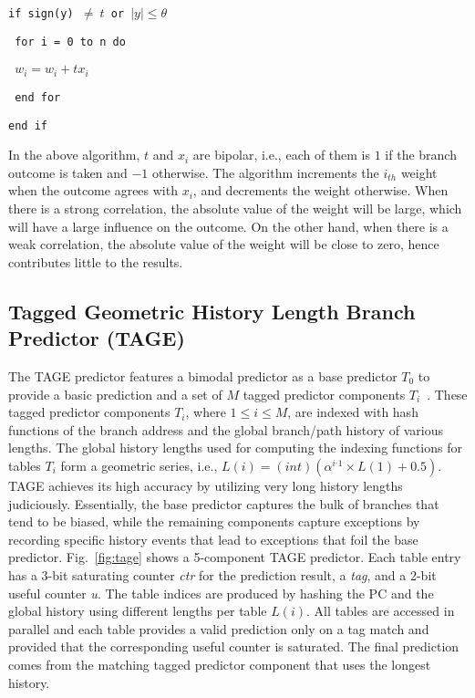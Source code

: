 \begin{spacing}{1} 
\texttt{if sign(y) $\neq\ t$ or $\left| y \right| \leq \theta$}

\texttt{\hspace{8mm} for i = 0 to n do}

\texttt{\hspace{16mm} $w_i = w_i + tx_i$}

\texttt{\hspace{8mm} end for}

\texttt{end if}
\end{spacing}
\vspace{8 mm}

In the above algorithm, $t$ and $x_i$ are bipolar, i.e., each of them is $1$ if the branch outcome is taken and $-1$ otherwise. The algorithm increments the $i_{th}$ weight when the outcome agrees with $x_i$, and decrements the weight otherwise. When there is a strong correlation, the absolute value of the weight will be large, which will have a large influence on the outcome. On the other hand, when there is a weak correlation, the absolute value of the weight will be close to zero, hence contributes little to the results.


\subsection{Tagged Geometric History Length Branch Predictor (TAGE)}
\label{sec:background:dirpred:tage}
The TAGE predictor features a bimodal predictor as a base predictor $T_0$ to provide a basic prediction and a set of $M$ tagged predictor components $T_i$~\cite{tage}. These tagged predictor components $T_i$, where $1\leq i\leq M$, are indexed with hash functions of the branch address and the global branch/path history of various lengths. The global history lengths used for computing the indexing functions for tables $T_i$ form a geometric series, i.e., $L(i) = (int)(\alpha^{i{}^{\_}1}\times L(1)+0.5)$. TAGE achieves its high accuracy by utilizing very long history lengths judiciously.
Essentially, the base predictor captures the bulk of branches that tend to be biased, while the remaining components capture exceptions by recording specific history events that lead to exceptions that foil the base predictor.
Fig.~\ref{fig:tage} shows a 5-component TAGE predictor. Each table entry has a 3-bit saturating counter \textit{ctr} for the prediction result, a \textit{tag}, and a 2-bit useful counter \textit{u}. The table indices are produced by hashing the PC and the global history using different lengths per table $L(i)$. All tables are accessed in parallel and each table provides a valid prediction only on a tag match and provided that the corresponding useful counter is saturated. The final prediction comes from the matching tagged predictor component that uses the longest history.

